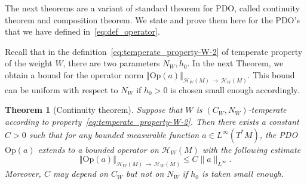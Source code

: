 \documentclass[10pt]{amsart}
\newtheorem{theo}{Theorem}[section]
\theoremstyle{definition}\newtheorem{defi}[theo]{Definition}\newtheorem{rema}[theo]{Remark}\newtheorem{exam}[theo]{Example}\newtheorem{exem}[theo]{Example}\newtheorem{nota}[theo]{Notation}
\newcommand{\clH}{\mathcal{H}}
\newcommand{\Opp}{\mathrm{Op}}
\begin{document}
The next theorems are a variant of standard theorem for PDO, called continuity theorem and composition theorem. We state and prove them here for the PDO's that we have defined in~\eqref{eq:def_operator}.

Recall that in the definition~\eqref{eq:temperate_property-W-2} of temperate property of the weight $W$, there are two parameters $N_{W},h_{0}$. In the next Theorem, we obtain a bound for the operator norm $\Vert \Opp (a)\Vert _{\clH _{W}(M)\,\rightarrow\,\clH _{W}(M)}$. This bound can be uniform with respect to $N_{W}$ if $h_{0}>0$ is chosen small enough accordingly.

\begin{cBoxB}{}
\begin{theo}[Continuity theorem]\label{thm:Continuity-of-PDO}
Suppose that $W$ is $(C_{W},N_{W})$-temperate according to property~\eqref{eq:temperate_property-W-2}. Then there exists a constant $C>0$ such that for any bounded measurable function $a\in L^{\infty}(T^{*}M)$, the PDO $\Opp (a)$ extends to a bounded operator on $\clH _{W}(M)$ with the following estimate
\[
\left\Vert \Opp (a)\right\Vert _{\clH _{W}(M)\,\rightarrow\,\clH _{W}(M)}\leq C\|a\|_{L^{\infty}}.
\]
Moreover, $C$ may depend on $C_{W}$ but not on $N_{W}$ if $h_{0}$ is taken small enough.
\end{theo}
\end{cBoxB}
\end{document}
